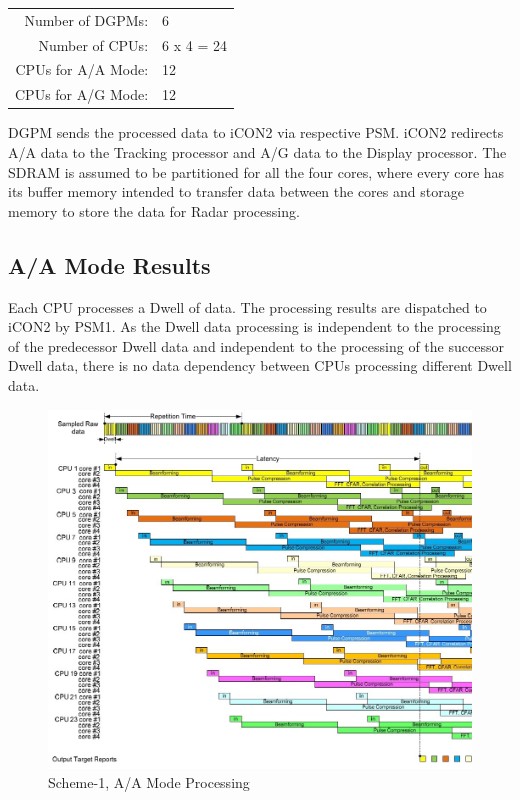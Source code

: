 \begin{tabular}{rl}
	Number of DGPMs: & 6 \\
	Number of CPUs: & 6 x 4 = 24 \\
	CPUs for A/A Mode: & 12 \\
	CPUs for A/G Mode: & 12 \\
\end{tabular}

\noindent
DGPM sends the processed data to iCON2 via respective PSM. iCON2 redirects A/A data to the Tracking processor and A/G data to the Display processor. The SDRAM is assumed to be partitioned for all the four cores, where every core has its buffer memory intended to transfer data between the cores and storage memory to store the data for Radar processing.

\subsection{A/A Mode Results}
\label{ss:scheme1:aa}
Each CPU processes a Dwell of data. The processing results are dispatched to iCON2 by PSM1. As the Dwell data processing is independent to the processing of the predecessor Dwell data and independent to the processing of the successor Dwell data, there  is no data dependency between CPUs processing different Dwell data.

\begin{figure}[h!]
	\centering
	\includegraphics[width=140mm]{figures/aa_scheme1}
	\caption{Scheme-1, A/A Mode Processing}
	\label{fig:existing_analysis:aa_scheme1}
\end{figure}


